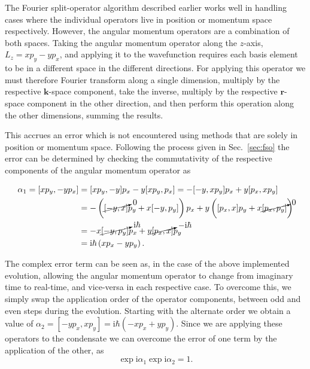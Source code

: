 The Fourier split-operator algorithm described earlier works well in handling cases where the individual operators live in position or momentum space respectively. However, the angular momentum operators are a combination of both spaces. Taking the angular momentum operator along the $z$-axis, $L_z = xp_y - yp_x$, and applying it to the wavefunction requires each basis element to be in a different space in the different directions. For applying this operator we must therefore Fourier transform along a single dimension, multiply by the respective $\mathbf{k}$-space component, take the inverse, multiply by the respective $\mathbf{r}$-space component in the other direction, and then perform this operation along the other dimensions, summing the results.

This accrues an error which is not encountered using methods that are solely in position or momentum space. Following the process given in Sec.~\ref{sec:fso} the error can be determined by checking the commutativity of the respective components of the angular momentum operator as

 \begin{align}
 	\alpha_1 = [x p_y,-y p_x] &= [x p_y,-y] p_x  -  y[x p_y,p_x] = -[-y,x p_y] p_x + y [p_x, x p_y] \nonumber \\
 		&= -\left( {\cancelto{0}{[-y,x]}} p_y + x [-y,p_y] \right) p_x + y \left( [p_x,x] p_y + x {\cancelto{0}{[p_x,p_y]}} \right) \nonumber \\
 		&= -x {\cancelto{\textrm{i}\hbar}{[-y, p_y]}} p_x + y {\cancelto{-\textrm{i}\hbar}{[p_x,x]}} p_y \nonumber \\
        &= \textrm{i}\hbar \left(x p_x - y p_y \right).
 \end{align}

 The complex error term can be seen as, in the case of the above implemented evolution, allowing the angular momentum operator to change from imaginary time to real-time, and vice-versa in each respective case. To overcome this, we simply swap the application order of the operator components, between odd and even steps during the evolution. Starting with the alternate order we obtain a value of $\alpha_2 = [-y p_x, x p_y] = \textrm{i}\hbar \left(-x p_x + y p_y \right)$. Since we are applying these operators to the condensate we can overcome the error of one term by the application of the other, as
 \begin{equation}
 \exp{\textrm{i} \alpha_1}\exp{\textrm{i} \alpha_2} = 1.
 \end{equation}

